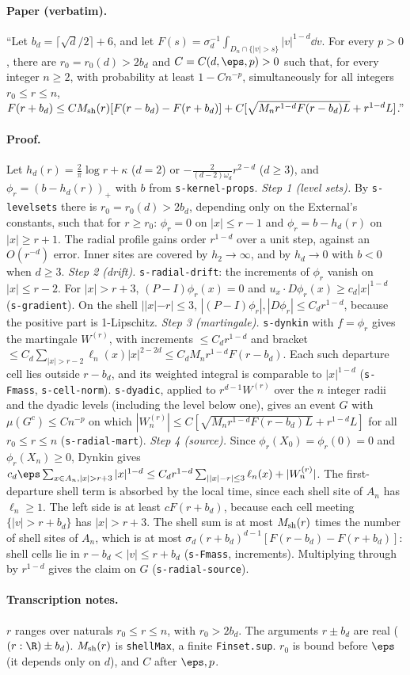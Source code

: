 \paragraph{Paper (verbatim).} ``Let $b_d=\lceil\sqrt d/2\rceil+6$, and let
$F(s)=\sigma_d^{-1}\int_{D_n\cap\{|v|>s\}}|v|^{1-d}\dd v$. For every $p>0$, there are $r_0=r_0(d)>2b_d$
and $C=C(d,\eps,p)>0$ such that, for every integer $n\geq2$, with probability at least $1-Cn^{-p}$,
simultaneously for all integers $r_0\leq r\leq n$,
$F(r+b_d)\leq CM_{\rm sh}(r)[F(r-b_d)-F(r+b_d)]+C[\sqrt{M_nr^{1-d}F(r-b_d)L}+r^{1-d}L]$.''
\paragraph{Proof.} Let $h_d(r)=\frac2\pi\log r+\kappa$ ($d=2$) or $-\frac2{(d-2)\omega_d}r^{2-d}$
($d\ge3$), and $\phi_r=(b-h_d(r))_+$ with $b$ from \texttt{s-kernel-props}.
\emph{Step 1 (level sets).} By \texttt{s-levelsets} there is $r_0=r_0(d)>2b_d$, depending only on the
External's constants, such that for $r\ge r_0$: $\phi_r=0$ on $|x|\le r-1$ and $\phi_r=b-h_d(r)$ on
$|x|\ge r+1$. The radial profile gains order $r^{1-d}$ over a unit step, against an $O(r^{-d})$
error. Inner sites are covered by $h_2\to\infty$, and by $h_d\to0$ with $b<0$ when $d\ge3$.
\emph{Step 2 (drift).} \texttt{s-radial-drift}: the increments of $\phi_r$ vanish on $|x|\le r-2$.
For $|x|>r+3$, $(P-I)\phi_r(x)=0$ and $u_x\cdot D\phi_r(x)\ge c_d|x|^{1-d}$ (\texttt{s-gradient}).
On the shell $||x|-r|\le3$, $|(P-I)\phi_r|,|D\phi_r|\le C_dr^{1-d}$, because the positive part is
1-Lipschitz.
\emph{Step 3 (martingale).} \texttt{s-dynkin} with $f=\phi_r$ gives the martingale $W^{(r)}$, with
increments $\le C_dr^{1-d}$ and bracket $\le C_d\sum_{|x|>r-2}\ell_n(x)|x|^{2-2d}\le C_dM_nr^{1-d}F(r-b_d)$.
Each such departure cell lies outside $r-b_d$, and its weighted integral is comparable to
$|x|^{1-d}$ (\texttt{s-Fmass}, \texttt{s-cell-norm}). \texttt{s-dyadic}, applied to $r^{d-1}W^{(r)}$
over the $n$ integer radii and the dyadic levels (including the level below one), gives an event
$G$ with $\mu(G^c)\le Cn^{-p}$ on which
$|W^{(r)}_n|\le C[\sqrt{M_nr^{1-d}F(r-b_d)L}+r^{1-d}L]$ for all $r_0\le r\le n$
(\texttt{s-radial-mart}).
\emph{Step 4 (source).} Since $\phi_r(X_0)=\phi_r(0)=0$ and $\phi_r(X_n)\ge0$, Dynkin gives
$c_d\eps\sum_{x\in A_n,|x|>r+3}|x|^{1-d}\le C_dr^{1-d}\sum_{||x|-r|\le3}\ell_n(x)+|W^{(r)}_n|$. The
first-departure shell term is absorbed by the local time, since each shell site of $A_n$ has
$\ell_n\ge1$. The left side is at least $cF(r+b_d)$, because each cell meeting $\{|v|>r+b_d\}$ has
$|x|>r+3$. The shell sum is at most $M_{\rm sh}(r)$ times the number of shell sites of $A_n$, which
is at most $\sigma_d(r+b_d)^{d-1}[F(r-b_d)-F(r+b_d)]$: shell cells lie in $r-b_d<|v|\le r+b_d$
(\texttt{s-Fmass}, increments). Multiplying through by $r^{1-d}$ gives the claim on $G$
(\texttt{s-radial-source}).
\paragraph{Transcription notes.} $r$ ranges over naturals $r_0\le r\le n$, with $r_0>2b_d$. The
arguments $r\pm b_d$ are real ($(r:\R)\pm b_d$). $M_{\rm sh}(r)$ is \texttt{shellMax}, a finite
\texttt{Finset.sup}. $r_0$ is bound before $\eps$ (it depends only on $d$), and $C$ after $\eps,p$.
